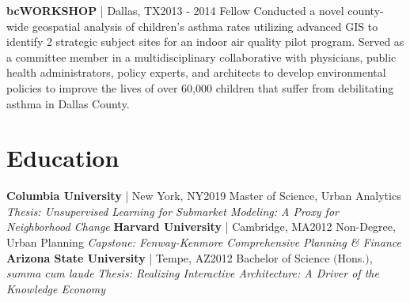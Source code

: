 \documentclass{article}
\begin{document}
\begin{bgbox}[
        height = \paperheight,
        width = 0.69\textwidth,
        colback = white
    ]
{                \textbf{bcWORKSHOP} | Dallas, TX\hfill{2013 - 2014}\newline
                Fellow\newline\newline
                Conducted a novel county-wide geospatial analysis of children's asthma rates utilizing advanced GIS to identify 2 strategic subject sites for an indoor air quality pilot program. Served as a committee member in a multidisciplinary collaborative with physicians, public health administrators, policy experts, and architects to develop environmental policies to improve the lives of over 60,000 children that suffer from debilitating asthma in Dallas County.
                \section*{Education}
                \textbf{Columbia University} | New York, NY\hfill{2019}\newline
                        Master of Science, Urban Analytics\newline
                            \textit{Thesis: Unsupervised Learning for Submarket Modeling: A Proxy for Neighborhood Change}\newline\newline
                \textbf{Harvard University} | Cambridge, MA\hfill{2012}\newline
                        Non-Degree, Urban Planning\newline
                            \textit{Capstone: Fenway-Kenmore Comprehensive Planning \& Finance}\newline\newline
                \textbf{Arizona State University} | Tempe, AZ\hfill{2012}\newline 
                        Bachelor of Science $($Hons.$)$, \textit{summa cum laude}\newline
                            \textit{Thesis: Realizing Interactive Architecture: A Driver of the Knowledge Economy}
}
\end{bgbox}
\end{document}
